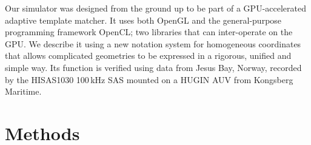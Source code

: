 
Our simulator was designed from the ground up to be part of a GPU-accelerated adaptive template matcher. It uses both OpenGL and the general-purpose programming framework OpenCL; two libraries that can inter-operate on the GPU. We describe it using a new notation system for homogeneous coordinates that allows complicated geometries to be expressed in a rigorous, unified and simple way. Its function is verified using data from Jesus Bay, Norway, recorded by the HISAS1030 100\,kHz SAS  mounted on a HUGIN AUV from Kongsberg Maritime.



\section{Methods}\label{IV_methods}


